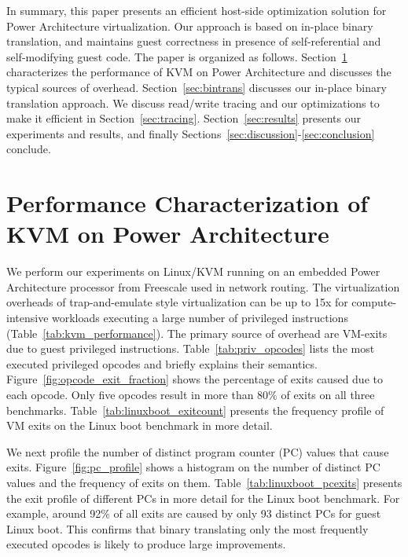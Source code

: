 \documentclass[10pt,twocolumn]{article}
\begin{document}
In summary, this paper presents an efficient host-side optimization solution for
Power Architecture virtualization. Our approach is based on in-place binary translation,
and maintains guest correctness in presence of self-referential and self-modifying
guest code.
The paper is organized as
follows. Section~\ref{sec:performance_char} characterizes the performance of
KVM on Power Architecture and discusses the typical sources of overhead.
Section~\ref{sec:bintrans} discusses our in-place binary translation approach.
We discuss read/write tracing and our optimizations to make
it efficient in Section~\ref{sec:tracing}.
Section~\ref{sec:results} presents our experiments and results, and
finally Sections~\ref{sec:discussion}-\ref{sec:conclusion} conclude.

\section{Performance Characterization of KVM on Power Architecture}
\label{sec:performance_char}
We perform our experiments on Linux/KVM running on an
embedded Power Architecture processor from Freescale used in network
routing.
The virtualization overheads
of trap-and-emulate style virtualization can be up to 15x for compute-intensive
workloads executing a large number of privileged
instructions (Table~\ref{tab:kvm_performance}). The primary source of
overhead are VM-exits due to guest privileged instructions.
Table~\ref{tab:priv_opcodes} lists the most executed privileged
opcodes and briefly explains their semantics.
Figure~\ref{fig:opcode_exit_fraction} shows the percentage of exits caused
due to each opcode. Only five opcodes result in more than 80\% of exits on all
three benchmarks. Table~\ref{tab:linuxboot_exitcount} presents the frequency
profile of VM exits on the Linux boot benchmark in more detail.

We next profile the number of distinct program counter (PC) values that
cause exits. Figure~\ref{fig:pc_profile} shows a histogram on the number
of distinct PC values and the frequency of exits on them.
Table~\ref{tab:linuxboot_pcexits} presents the exit profile of different
PCs in more detail for the Linux boot benchmark. For example, around 92\% of all
exits are caused by only 93 distinct PCs for guest Linux boot. This confirms that
binary translating
only the most frequently executed opcodes is likely to produce large improvements.
\end{document}
